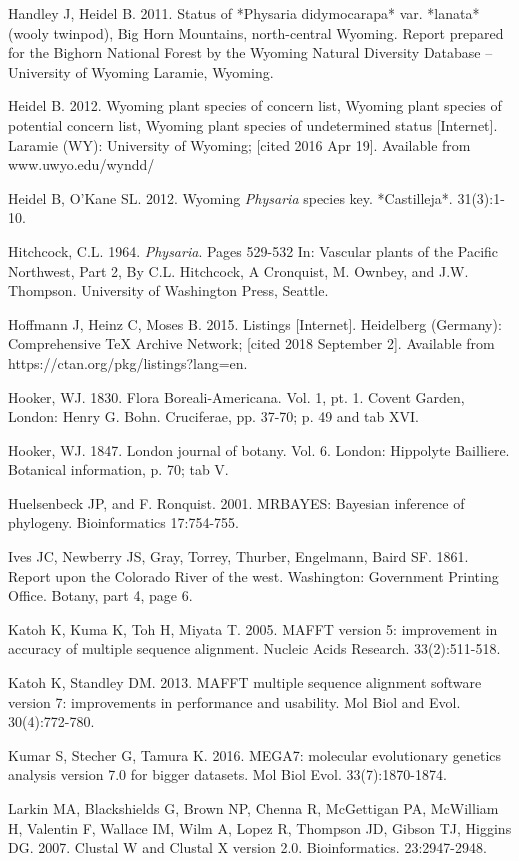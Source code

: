 Handley J, Heidel B. 2011. Status of *Physaria didymocarapa* var. *lanata* (wooly twinpod), Big Horn Mountains, north-central Wyoming. Report prepared for the Bighorn National Forest by the Wyoming Natural Diversity Database – University of Wyoming Laramie, Wyoming.  

Heidel B. 2012. Wyoming plant species of concern list, Wyoming plant species of potential concern list, Wyoming plant species of undetermined status  [Internet]. Laramie (WY): University of Wyoming; [cited 2016 Apr 19]. Available from www.uwyo.edu/wyndd/

Heidel B, O’Kane SL. 2012. Wyoming \textit{Physaria} species key. *Castilleja*. 31(3):1-10.

Hitchcock, C.L. 1964. \textit{Physaria}. Pages 529-532 In: Vascular plants of the Pacific Northwest, Part 2, By C.L. Hitchcock, A Cronquist, M. Ownbey, and J.W. Thompson. University of Washington Press, Seattle.

Hoffmann J, Heinz C, Moses B. 2015. Listings [Internet]. Heidelberg (Germany): Comprehensive TeX Archive Network; [cited 2018 September 2]. Available from https://ctan.org/pkg/listings?lang=en.

Hooker, WJ. 1830. Flora Boreali-Americana. Vol. 1, pt. 1. Covent Garden, London: Henry G. Bohn. Cruciferae, pp. 37-70; p. 49 and tab XVI.

Hooker, WJ. 1847. London journal of botany. Vol. 6. London: Hippolyte Bailliere. Botanical information, p. 70; tab V.  

Huelsenbeck JP, and F. Ronquist. 2001. MRBAYES: Bayesian inference of phylogeny. Bioinformatics 17:754-755.

Ives JC, Newberry JS, Gray, Torrey, Thurber, Engelmann, Baird SF. 1861. Report upon the Colorado River of the west. Washington: Government Printing Office. Botany, part 4, page 6. 

Katoh K, Kuma K, Toh H, Miyata T. 2005. MAFFT version 5: improvement in accuracy of multiple sequence alignment. Nucleic Acids Research. 33(2):511-518.

Katoh K, Standley DM. 2013. MAFFT multiple sequence alignment software version 7: improvements in performance and usability.  Mol Biol and Evol. 30(4):772-780.

Kumar S, Stecher G, Tamura K. 2016. MEGA7: molecular evolutionary genetics analysis version 7.0 for bigger datasets. Mol Biol Evol. 33(7):1870-1874.

Larkin MA, Blackshields G, Brown NP, Chenna R, McGettigan PA, McWilliam H, Valentin F, Wallace IM, Wilm A, Lopez R, Thompson JD, Gibson TJ, Higgins DG. 2007. Clustal W and Clustal X version 2.0. Bioinformatics. 23:2947-2948. 

